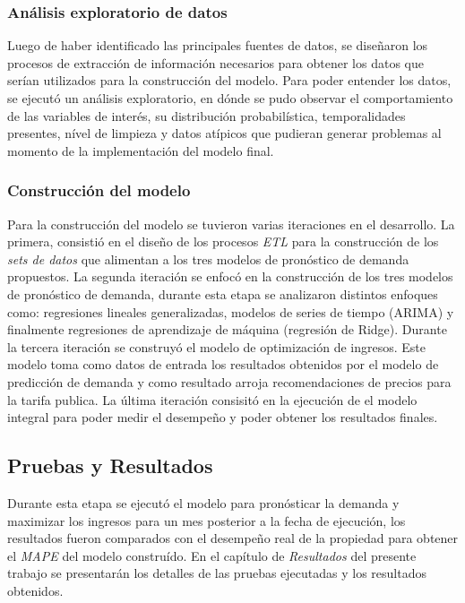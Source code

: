 \subsubsection*{Análisis exploratorio de datos}

Luego de haber identificado las principales fuentes de datos, se diseñaron los procesos de extracción de información necesarios para obtener los datos que serían utilizados para la construcción del modelo. Para poder entender los datos, se ejecutó un análisis exploratorio, en dónde se pudo observar el comportamiento de las variables de interés, su distribución probabilística, temporalidades presentes, nível de limpieza y datos atípicos que pudieran generar problemas al momento de la implementación del modelo final.

\subsubsection*{Construcción del modelo}

Para la construcción del modelo se tuvieron varias iteraciones en el desarrollo. La primera, consistió en el diseño de los procesos \emph{ETL} para la construcción de los \emph{sets de datos} que alimentan a los tres modelos de pronóstico de demanda propuestos. La segunda iteración se enfocó en la construcción de los tres modelos de pronóstico de demanda, durante esta etapa se analizaron distintos enfoques como: regresiones lineales generalizadas, modelos de series de tiempo (ARIMA) y finalmente regresiones de aprendizaje de máquina (regresión de Ridge). Durante la tercera iteración se construyó el modelo de optimización de ingresos. Este modelo toma como datos de entrada los resultados obtenidos por el modelo de predicción de demanda y como resultado arroja recomendaciones de precios para la tarifa publica. La última iteración consisitó en la ejecución de el modelo integral para poder medir el desempeño y poder obtener los resultados finales.

\subsection*{Pruebas y Resultados}

Durante esta etapa se ejecutó el modelo para pronósticar la demanda y maximizar los ingresos para un mes posterior a la fecha de ejecución, los resultados fueron comparados con el desempeño real de la propiedad para obtener el \emph{MAPE} del modelo construído. En el capítulo de \emph{Resultados} del presente trabajo se presentarán los detalles de las pruebas ejecutadas y los resultados obtenidos.
